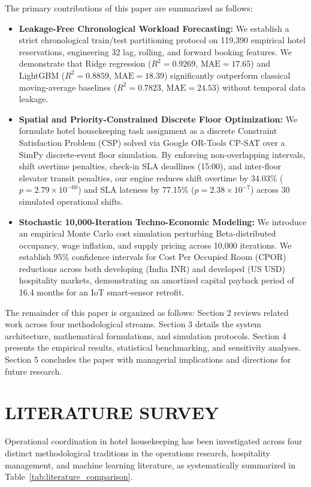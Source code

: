 \documentclass[11pt,a4paper]{article}
\begin{document}
The primary contributions of this paper are summarized as follows:
\begin{itemize}
    \item \textbf{Leakage-Free Chronological Workload Forecasting:} We establish a strict chronological train/test partitioning protocol on 119,390 empirical hotel reservations, engineering 32 lag, rolling, and forward booking features. We demonstrate that Ridge regression ($R^2 = 0.9269$, $\text{MAE} = 17.65$) and LightGBM ($R^2 = 0.8859$, $\text{MAE} = 18.39$) significantly outperform classical moving-average baselines ($R^2 = 0.7823$, $\text{MAE} = 24.53$) without temporal data leakage.
    \item \textbf{Spatial and Priority-Constrained Discrete Floor Optimization:} We formulate hotel housekeeping task assignment as a discrete Constraint Satisfaction Problem (CSP) solved via Google OR-Tools CP-SAT over a SimPy discrete-event floor simulation. By enforcing non-overlapping intervals, shift overtime penalties, check-in SLA deadlines (15:00), and inter-floor elevator transit penalties, our engine reduces shift overtime by 34.03\% ($p = 2.79 \times 10^{-60}$) and SLA lateness by 77.15\% ($p = 2.38 \times 10^{-7}$) across 30 simulated operational shifts.
    \item \textbf{Stochastic 10,000-Iteration Techno-Economic Modeling:} We introduce an empirical Monte Carlo cost simulation perturbing Beta-distributed occupancy, wage inflation, and supply pricing across 10,000 iterations. We establish 95\% confidence intervals for Cost Per Occupied Room (CPOR) reductions across both developing (India INR) and developed (US USD) hospitality markets, demonstrating an amortized capital payback period of 16.4 months for an IoT smart-sensor retrofit.
\end{itemize}

The remainder of this paper is organized as follows: Section 2 reviews related work across four methodological streams. Section 3 details the system architecture, mathematical formulations, and simulation protocols. Section 4 presents the empirical results, statistical benchmarking, and sensitivity analyses. Section 5 concludes the paper with managerial implications and directions for future research.

\section{LITERATURE SURVEY}

Operational coordination in hotel housekeeping has been investigated across four distinct methodological traditions in the operations research, hospitality management, and machine learning literature, as systematically summarized in Table~\ref{tab:literature_comparison}.
\end{document}
